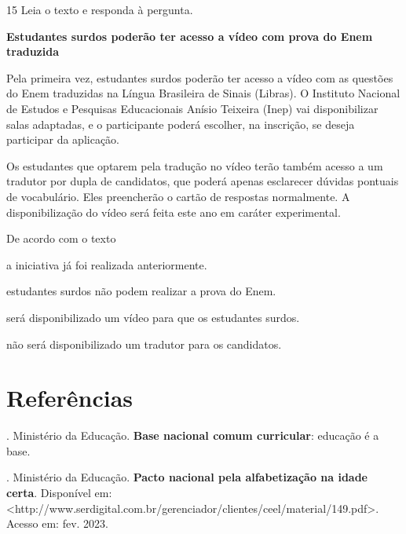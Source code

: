\begin{myquote}
\begin{myescolha}
\num{15} Leia o texto e responda à pergunta.

\begin{myquote}
\textbf{Estudantes surdos poderão ter acesso a vídeo com prova do Enem
traduzida}

Pela primeira vez, estudantes surdos poderão ter acesso a vídeo com as
questões do Enem traduzidas na Língua Brasileira de Sinais (Libras). O
Instituto Nacional de Estudos e Pesquisas Educacionais Anísio Teixeira
(Inep) vai disponibilizar salas adaptadas, e o participante poderá
escolher, na inscrição, se deseja participar da aplicação.

Os estudantes que optarem pela tradução no vídeo terão também acesso a
um tradutor por dupla de candidatos, que poderá apenas esclarecer
dúvidas pontuais de vocabulário. Eles preencherão o cartão de respostas
normalmente. A disponibilização do vídeo será feita este ano em caráter
experimental.

\end{myquote}

De acordo com o texto

\begin{escolha}
  \item a iniciativa já foi realizada anteriormente.

  \item estudantes surdos não podem realizar a prova do Enem.

  \item será disponibilizado um vídeo para que os estudantes surdos.

  \item não será disponibilizado um tradutor para os candidatos.
\end{escolha}

\chapter{Referências}

\begin{bibliohedra}
. Ministério da Educação. \textbf{Base nacional comum curricular}:
educação é a base.

. Ministério da Educação. \textbf{Pacto nacional pela
alfabetização na idade certa}. Disponível em:
\textless{}http://www.serdigital.com.br/gerenciador/clientes/ceel/material/149.pdf\textgreater{}.
Acesso em: fev. 2023.


\end{bibliohedra}
\end{myescolha}
\end{myquote}
